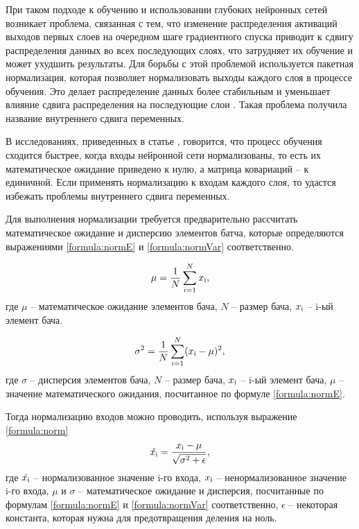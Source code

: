 При таком подходе к обучению и использовании глубоких нейронных сетей возникает проблема, связанная с тем, что изменение распределения активаций выходов первых слоев на очередном шаге градиентного спуска приводит к сдвигу распределения данных во всех последующих слоях, что затрудняет их обучение и может ухудшить результаты. Для борьбы с этой проблемой используется пакетная нормализация, которая позволяет нормализовать выходы каждого слоя в процессе обучения. Это делает распределение данных более стабильным и уменьшает влияние сдвига распределения на последующие слои \cite{burkholz2024batch}. Такая проблема получила название внутреннего сдвига переменных.

В исследованиях, приведенных в статье \cite{normalisation_lecun}, говорится, что процесс обучения сходится быстрее, когда входы нейронной сети нормализованы, то есть их математическое ожидание приведено к нулю, а матрица ковариаций -- к единичной. Если применять нормализацию к входам каждого слоя, то удастся избежать проблемы внутреннего сдвига переменных.

Для выполнения нормализации требуется предварительно рассчитать математическое ожидание и дисперсию элементов батча, которые определяются выражениями \ref{formula:normE} и \ref{formula:normVar} соответственно.

\begin{equation}\label{formula:normE}
\mu = \frac{1}{N} \sum\limits_{i=1}^{N}x_{\rm{i}},
\end{equation}
где $\mu$ -- математическое ожидание элементов бача, $N$ -- размер бача, $x_{\rm{i}}$ -- i-ый элемент бача.

\begin{equation}\label{formula:normVar}
\sigma^2 = \frac{1}{N} \sum\limits_{i=1}^{N}(x_{\rm{i}} - \mu)^2,
\end{equation}
где $\sigma$ -- дисперсия элементов бача, $N$ -- размер бача, $x_{\rm{i}}$ -- i-ый элемент бача, $\mu$ -- значение математического ожидания, посчитанное по формуле \ref{formula:normE}.

Тогда нормализацию входов можно проводить, используя выражение \ref{formula:norm}
\begin{equation}\label{formula:norm}
\hat{x_{\rm{i}}} = \frac{x_{\rm{i}} - \mu}{\sqrt{\sigma^2 + \epsilon}},
\end{equation}
где $\hat{x_{\rm{i}}}$ -- нормализованное значение i-го входа, $x_{\rm{i}}$ -- ненормализованное значение i-го входа, $\mu$ и $\sigma$ -- математическое ожидание и дисперсия, посчитанные по формулам \ref{formula:normE} и \ref{formula:normVar} соответственно, $\epsilon$ -- некоторая константа, которая нужна для предотвращения деления на ноль.

